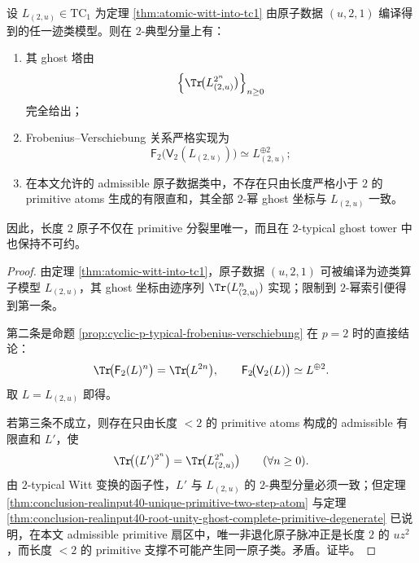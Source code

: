 \begin{theorem}\label{thm:conclusion-realinput40-two-typical-ghost-irreducibility}
设 \(L_{(2,u)}\in \mathrm{TC}_1\) 为定理 \ref{thm:atomic-witt-into-tc1} 由原子数据 \((u,2,1)\) 编译得到的任一迹类模型。则在 \(2\)-典型分量上有：
\begin{enumerate}
  \item 其 ghost 塔由
  \[
  \Bigl\{\Tr\!\bigl(L_{(2,u)}^{2^n}\bigr)\Bigr\}_{n\ge 0}
  \]
  完全给出；
  \item Frobenius--Verschiebung 关系严格实现为
  \[
  \mathsf F_2\!\bigl(\mathsf V_2(L_{(2,u)})\bigr)\simeq L_{(2,u)}^{\oplus 2};
  \]
  \item 在本文允许的 admissible 原子数据类中，不存在只由长度严格小于 \(2\) 的 primitive atoms 生成的有限直和，其全部 \(2\)-幂 ghost 坐标与 \(L_{(2,u)}\) 一致。
\end{enumerate}
因此，长度 \(2\) 原子不仅在 primitive 分裂里唯一，而且在 \(2\)-typical ghost tower 中也保持不可约。
\end{theorem}
\begin{proof}
由定理 \ref{thm:atomic-witt-into-tc1}，原子数据 \((u,2,1)\) 可被编译为迹类算子模型 \(L_{(2,u)}\)，其 ghost 坐标由迹序列 \(\Tr(L_{(2,u)}^n)\) 实现；限制到 \(2\)-幂索引便得到第一条。

第二条是命题 \ref{prop:cyclic-p-typical-frobenius-verschiebung} 在 \(p=2\) 时的直接结论：
\[
\Tr\!\bigl(\mathsf F_2(L)^n\bigr)=\Tr\!\bigl(L^{2n}\bigr),
\qquad
\mathsf F_2\!\bigl(\mathsf V_2(L)\bigr)\simeq L^{\oplus 2}.
\]
取 \(L=L_{(2,u)}\) 即得。

若第三条不成立，则存在只由长度 \(<2\) 的 primitive atoms 构成的 admissible 有限直和 \(L'\)，使
\[
\Tr\!\bigl((L')^{2^n}\bigr)=\Tr\!\bigl(L_{(2,u)}^{2^n}\bigr)
\qquad(\forall n\ge 0).
\]
由 \(2\)-typical Witt 变换的函子性，\(L'\) 与 \(L_{(2,u)}\) 的 \(2\)-典型分量必须一致；但定理 \ref{thm:conclusion-realinput40-unique-primitive-two-step-atom} 与定理 \ref{thm:conclusion-realinput40-root-unity-ghost-complete-primitive-degenerate} 已说明，在本文 admissible primitive 扇区中，唯一非退化原子脉冲正是长度 \(2\) 的 \(uz^2\)，而长度 \(<2\) 的 primitive 支撑不可能产生同一原子类。矛盾。证毕。
\end{proof}

